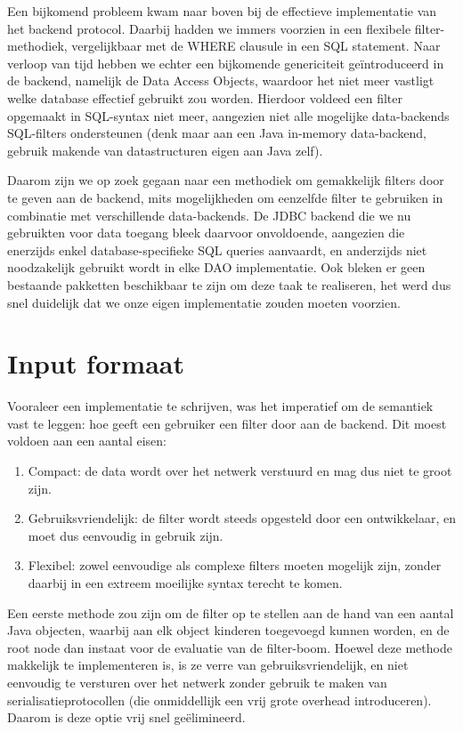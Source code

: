 Een bijkomend probleem kwam naar boven bij de effectieve implementatie van het backend protocol. Daarbij hadden we immers voorzien in een flexibele filter-methodiek, vergelijkbaar met de WHERE clausule in een SQL statement.
Naar verloop van tijd hebben we echter een bijkomende genericiteit ge\"introduceerd in de backend, namelijk de Data Access Objects, waardoor het niet meer vastligt welke database effectief gebruikt zou worden. Hierdoor voldeed een filter opgemaakt in SQL-syntax niet meer, aangezien niet alle mogelijke data-backends SQL-filters ondersteunen (denk maar aan een Java in-memory data-backend, gebruik makende van datastructuren eigen aan Java zelf).

Daarom zijn we op zoek gegaan naar een methodiek om gemakkelijk filters door te geven aan de backend, mits mogelijkheden om eenzelfde filter te gebruiken in combinatie met verschillende data-backends. De JDBC backend die we nu gebruikten voor data toegang bleek daarvoor onvoldoende, aangezien die enerzijds enkel database-specifieke SQL queries aanvaardt, en anderzijds niet noodzakelijk gebruikt wordt in elke DAO implementatie. Ook bleken er geen bestaande pakketten beschikbaar te zijn om deze taak te realiseren, het werd dus snel duidelijk dat we onze eigen implementatie zouden moeten voorzien.


\section{Input formaat}

Vooraleer een implementatie te schrijven, was het imperatief om de semantiek vast te leggen: hoe geeft een gebruiker een filter door aan de backend. Dit moest voldoen aan een aantal eisen:
\begin{enumerate}
\item Compact: de data wordt over het netwerk verstuurd en mag dus niet te groot zijn.
\item Gebruiksvriendelijk: de filter wordt steeds opgesteld door een ontwikkelaar, en moet dus eenvoudig in gebruik zijn.
\item Flexibel: zowel eenvoudige als complexe filters moeten mogelijk zijn, zonder daarbij in een extreem moeilijke syntax terecht te komen.
\end{enumerate}

Een eerste methode zou zijn om de filter op te stellen aan de hand van een aantal Java objecten, waarbij aan elk object kinderen toegevoegd kunnen worden, en de root node dan instaat voor de evaluatie van de filter-boom. Hoewel deze methode makkelijk te implementeren is, is ze verre van gebruiksvriendelijk, en niet eenvoudig te versturen over het netwerk zonder gebruik te maken van serialisatieprotocollen (die onmiddellijk een vrij grote overhead introduceren). Daarom is deze optie vrij snel ge\"elimineerd.

